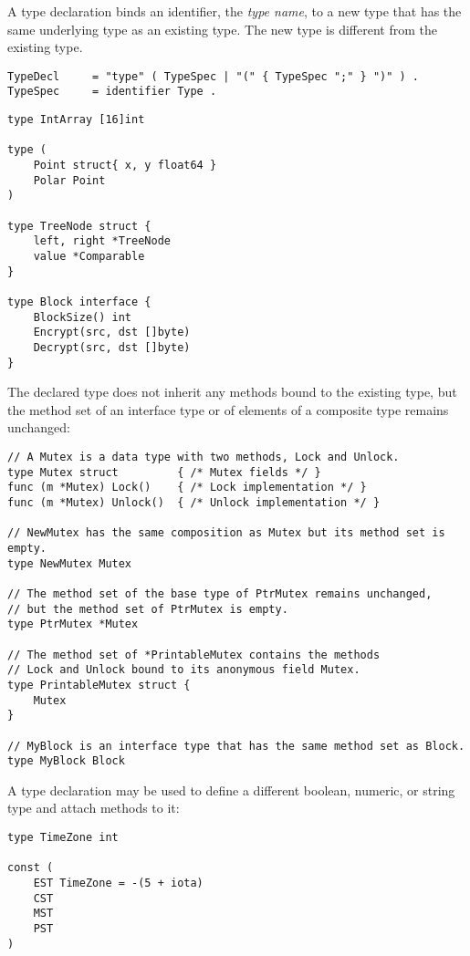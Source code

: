 {A type declaration binds an identifier, the \emph{type name}, to a new
type that has the same underlying type as an existing
type. The new type is different from the
existing type.

\begin{Verbatim}[frame=single]
TypeDecl     = "type" ( TypeSpec | "(" { TypeSpec ";" } ")" ) .
TypeSpec     = identifier Type .
\end{Verbatim}

\begin{Verbatim}[frame=single]
type IntArray [16]int

type (
    Point struct{ x, y float64 }
    Polar Point
)

type TreeNode struct {
    left, right *TreeNode
    value *Comparable
}

type Block interface {
    BlockSize() int
    Encrypt(src, dst []byte)
    Decrypt(src, dst []byte)
}
\end{Verbatim}

The declared type does not inherit any
methods bound to the existing type, but
the method set of an interface type or of
elements of a composite type remains unchanged:

\begin{Verbatim}[frame=single]
// A Mutex is a data type with two methods, Lock and Unlock.
type Mutex struct         { /* Mutex fields */ }
func (m *Mutex) Lock()    { /* Lock implementation */ }
func (m *Mutex) Unlock()  { /* Unlock implementation */ }

// NewMutex has the same composition as Mutex but its method set is empty.
type NewMutex Mutex

// The method set of the base type of PtrMutex remains unchanged,
// but the method set of PtrMutex is empty.
type PtrMutex *Mutex

// The method set of *PrintableMutex contains the methods
// Lock and Unlock bound to its anonymous field Mutex.
type PrintableMutex struct {
    Mutex
}

// MyBlock is an interface type that has the same method set as Block.
type MyBlock Block
\end{Verbatim}

A type declaration may be used to define a different boolean, numeric,
or string type and attach methods to it:

\begin{Verbatim}[frame=single]
type TimeZone int

const (
    EST TimeZone = -(5 + iota)
    CST
    MST
    PST
)


\end{Verbatim}}
